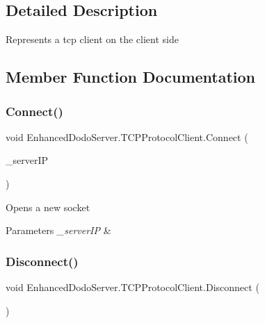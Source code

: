 \subsection{Detailed Description}
Represents a tcp client on the client side 



\subsection{Member Function Documentation}
\mbox{\label{class_enhanced_dodo_server_1_1_t_c_p_protocol_client_a4ac4ec505a2a7a9ca24b0b4c11f7ed61}} 
\subsubsection{\texorpdfstring{Connect()}{Connect()}}
{\footnotesize\ttfamily void Enhanced\+Dodo\+Server.\+T\+C\+P\+Protocol\+Client.\+Connect (\begin{DoxyParamCaption}\item[{I\+P\+Address}]{\+\_\+server\+IP }\end{DoxyParamCaption})}



Opens a new socket 


\begin{DoxyParams}{Parameters}
{\em \+\_\+server\+IP} & \\
\hline
\end{DoxyParams}
\mbox{\label{class_enhanced_dodo_server_1_1_t_c_p_protocol_client_ad87c3b6bfb3488eec6cd90da69eed8c1}} 
\subsubsection{\texorpdfstring{Disconnect()}{Disconnect()}}
{\footnotesize\ttfamily void Enhanced\+Dodo\+Server.\+T\+C\+P\+Protocol\+Client.\+Disconnect (\begin{DoxyParamCaption}{ }\end{DoxyParamCaption})}




